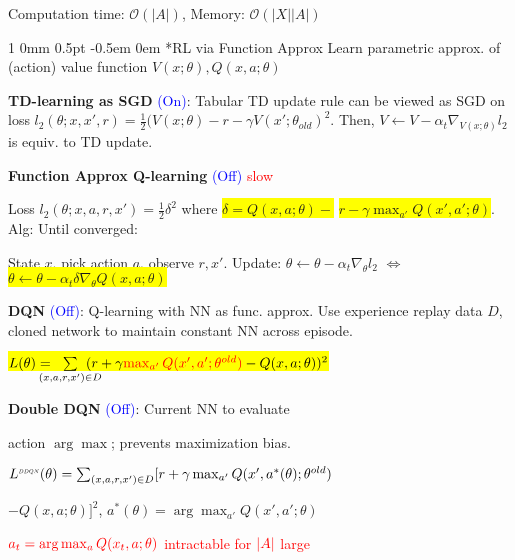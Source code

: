 \documentclass[11pt,landscape,a4paper,fleqn]{article}
\makeatletter
\newcommand*{\rsection}{%
	\@startsection{section}%
	{1}%
	{0mm}%
	{0.5pt}%
	{-0.5em \@plus 0em}
	{\color{myorange}\sffamily\small\bfseries}}
\newcommand{\mhl}[1]{\setlength{\fboxsep}{0pt}\colorbox{yellow}{#1}}
\makeatother
\begin{document}
\begin{multicols*}{4}
Computation time: $\mathcal{O}(|A|)$, Memory: $\mathcal{O}(|X||A|)$


\rsection*{RL via Function Approx} {\fontsize{9.5}{6}\selectfont Learn parametric approx. of (action) value function $V(x; \theta), Q(x,a;\theta)$}

\vspace*{1mm}
\textbf{TD-learning as SGD} {\fontsize{9}{6}\selectfont \textcolor{blue}{(On)}}: Tabular TD update rule can be viewed as SGD on loss $l_2(\theta; x, x', r) = \frac{1}{2}(V(x;\theta) - r - \gamma V(x'; \theta_{old})^2$. Then, $V \leftarrow V - \alpha_t \nabla_{V(x;\theta)} l_2$ is equiv. to TD update.

\textbf{Function Approx Q-learning} {\fontsize{9}{6}\selectfont \textcolor{blue}{(Off)}} \textcolor{red}{slow}

Loss $l_2(\theta;x,a,r,x') = \frac{1}{2}\delta^2$ where
\mhl{$\delta = Q(x,a;\theta) -$} \mhl{$r - \gamma \max_{a'}Q(x',a';\theta)$}. Alg: Until converged:

State $x$, pick action $a$, observe $r,x'$. Update: $\theta \leftarrow \theta - \alpha_t \nabla_\theta l_2$
$\Leftrightarrow$ \mhl{$\theta \leftarrow \theta - \alpha_t \delta \nabla_\theta Q(x,a;\theta)$}

\textbf{DQN} {\fontsize{9}{6}\selectfont \textcolor{blue}{(Off)}}: Q-learning with NN as func. approx. Use experience replay data $D$, cloned network to maintain constant NN across episode.

\mhl{$L(\theta) = \hspace*{-4mm} \sum\limits_{(x,a,r,x') \in D} \hspace*{-4mm} (r + \gamma \textcolor{red}{\max_{a'} Q(x', a'; \theta^{old})} - Q(x,a;\theta))^2$}

\textbf{Double DQN} {\fontsize{9}{6}\selectfont \textcolor{blue}{(Off)}}: Current NN to evaluate

action $\arg\max$; prevents maximization bias.

$L^{{\scaleobj{.55}{ DDQN}}} (\theta) = \hspace*{0mm} \sum_{(x,a,r,x') \in D} \hspace*{0mm} [r + \gamma \max_{a'} Q(x', a^*(\theta); \theta^{old})$

$ - Q(x,a;\theta) ]^2$,
$a^*(\theta) = \arg\max_{a'} Q(x', a'; \theta)$

\textcolor{red}{$\textcolor{red}{a_t = \arg\max_a Q(x_t,a;\theta)}$ intractable for $\textcolor{red}{|A|}$ large}



\end{multicols*}
\end{document}
